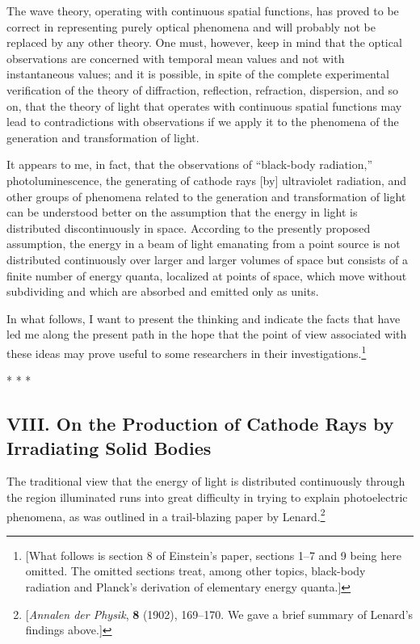 The wave theory, operating with continuous spatial functions, has proved
to be correct in representing purely optical phenomena and will probably
not be replaced by any other theory. One must, however, keep in mind
that the optical observations are concerned with temporal mean values
and not with instantaneous values; and it is possible, in spite of the
complete experimental verification of the theory of diffraction,
reflection, refraction, dispersion, and so on, that the theory of light
that operates with continuous spatial functions may lead to
contradictions with observations if we apply it to the phenomena of the
generation and transformation of light.

It appears to me, in fact, that the observations of ``black-body
radiation,'' photoluminescence, the generating of cathode rays {[}by{]}
ultraviolet radiation, and other groups of phenomena related to the
generation and transformation of light can be understood better on the
assumption that the energy in light is distributed discontinuously in
space. According to the presently proposed assumption, the energy in a
beam of light emanating from a point source is not distributed
continuously over larger and larger volumes of space but consists of a
finite number of energy quanta, localized at points of space, which move
without subdividing and which are absorbed and emitted only as units.

In what follows, I want to present the thinking and indicate the facts
that have led me along the present path in the hope that the point of
view associated with these ideas may prove useful to some researchers in
their investigations.\footnote{{[}What follows is section 8 of
  Einstein's paper, sections 1--7 and 9 being here omitted. The omitted
  sections treat, among other topics, black-body radiation and Planck's
  derivation of elementary energy quanta.{]}}\\
\centerline{* * *}
%
\subsection*{VIII. On the Production of Cathode Rays by Irradiating Solid Bodies}

The traditional view that the energy of light is distributed
continuously through the region illuminated runs into great difficulty
in trying to explain photoelectric phenomena, as was outlined in a
trail-blazing paper by Lenard.\footnote{{[}\emph{Annalen der Physik}, \textbf{8}
  (1902), 169--170. We gave a brief summary of Lenard's findings above.{]}}

